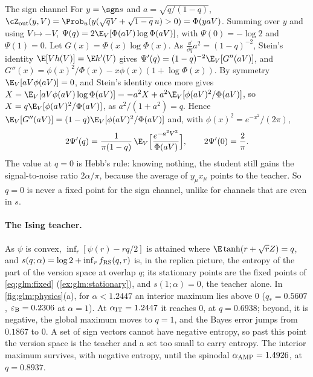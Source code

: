 \begin{refsection}
\begin{computation}{The sign channel}\label{comp:glm:sign}
\step For $y=\sgn s$ and $a=\sqrt{q/(1-q)}$, $\glmZout(y,V)=\Prob_u(y(\sqrt qV+\sqrt{1-q}\,u)>0)=\Phi(yaV)$. Summing over $y$ and using $V\mapsto-V$, $\Psi(q)=2\E_V[\Phi(aV)\log\Phi(aV)]$, with $\Psi(0)=-\log2$ and $\Psi(1)=0$.
\step Let $G(x)=\Phi(x)\log\Phi(x)$. As $\frac{\dd}{\dd q}a^2=(1-q)^{-2}$, Stein's identity $\E[Vh(V)]=\E h'(V)$ gives $\Psi'(q)=(1-q)^{-2}\E_V[G''(aV)]$, and $G''(x)=\phi(x)^2/\Phi(x)-x\phi(x)(1+\log\Phi(x))$.
\step By symmetry $\E_V[aV\phi(aV)]=0$, and Stein's identity once more gives $X=\E_V[aV\phi(aV)\log\Phi(aV)]=-a^2X+a^2\E_V[\phi(aV)^2/\Phi(aV)]$, so $X=q\E_V[\phi(aV)^2/\Phi(aV)]$, as $a^2/(1+a^2)=q$.
\step Hence $\E_V[G''(aV)]=(1-q)\E_V[\phi(aV)^2/\Phi(aV)]$ and, with $\phi(x)^2=e^{-x^2}/(2\pi)$,
\[
2\Psi'(q)=\frac1{\pi(1-q)}\,\E_V\Bigl[\frac{e^{-a^2V^2}}{\Phi(aV)}\Bigr],\qquad2\Psi'(0)=\frac2\pi.
\]
\step The value at $q=0$ is Hebb's rule: knowing nothing, the student still gains the signal-to-noise ratio $2\alpha/\pi$, because the average of $y_\mu x_\mu$ points to the teacher. So $q=0$ is never a fixed point for the sign channel, unlike for channels that are even in $s$.
\end{computation}

\paragraph{The Ising teacher.} As $\psi$ is convex, $\inf_r[\psi(r)-rq/2]$ is attained where $\E\tanh(r+\sqrt rZ)=q$, and $s(q;\alpha)=\log2+\inf_rf_{\mathrm{RS}}(q,r)$ is, in the replica picture, the entropy of the part of the version space at overlap $q$; its stationary points are the fixed points of \eqref{eq:glm:fixed} (\cref{ex:glm:stationary}), and $s(1;\alpha)=0$, the teacher alone. In \cref{fig:glm:physics}(a), for $\alpha<1.2447$ an interior maximum lies above $0$ ($q_*=0.5607$, $\varepsilon_{\mathrm{B}}=0.2306$ at $\alpha=1$). At $\alpha_{\mathrm{IT}}=1.2447$ it reaches $0$, at $q=0.6938$; beyond, it is negative, the global maximum moves to $q=1$, and the Bayes error jumps from $0.1867$ to $0$. A set of sign vectors cannot have negative entropy, so past this point the version space is the teacher and a set too small to carry entropy. The interior maximum survives, with negative entropy, until the spinodal $\alpha_{\mathrm{AMP}}=1.4926$, at $q=0.8937$.


\end{refsection}

